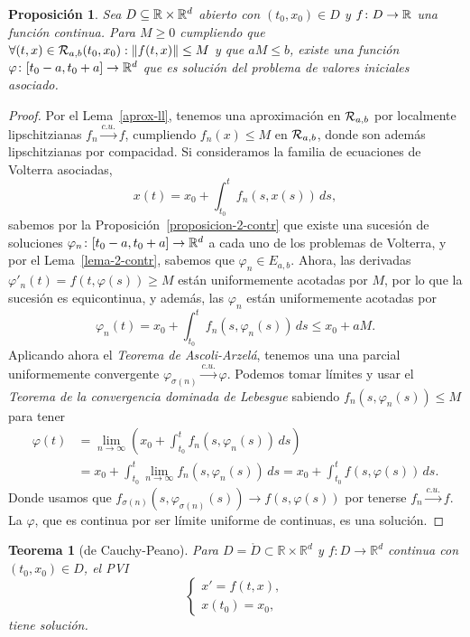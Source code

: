 \documentclass[11pt]{article}
\theoremstyle{plain}
\newtheorem{theorem}{Teorema}
\newtheorem{proposition}{Proposición}
\theoremstyle{definition}
\theoremstyle{remark}
\begin{document}
\begin{proposition}\label{propcauchypeano}
  Sea $D \subseteq \mathbb{R} \times \mathbb{R}^d$ abierto con $(t_0,x_0) \in D$ y $f \colon D \to \mathbb{R}$ una función continua.
  Para \(M \geq 0\) cumpliendo que \(\forall (t,x)\in {{\cal{R}}}_{a,b}(t_0,x_0) : \|f(t,x)\| \leq M\) y
  que $aM \leq b$, existe una función $\varphi \colon [t_0-a,t_0+a] \to \mathbb{R}^d$ que es solución
  del problema de valores iniciales asociado.
\end{proposition}
\begin{proof}
  Por el Lema~\ref{aprox-ll}, tenemos una aproximación en ${{\cal{R}}}_{a,b}$ por localmente
  lipschitzianas $f_n \overset{c.u.}\longrightarrow f$, cumpliendo $f_n(x) \leq M$ en ${{\cal{R}}}_{a,b}$, donde
  son además lipschitzianas por compacidad. Si consideramos la familia de ecuaciones
  de Volterra asociadas,
  \[
    x(t) = x_0 + \int_{t_0}^t f_n(s,x(s))\,ds,
  \]
  sabemos por la Proposición~\ref{proposicion-2-contr} que existe una sucesión
  de soluciones $\varphi_n \colon [t_0-a,t_0+a]\to\mathbb{R}^d$ a cada uno de los problemas de Volterra,
  y por el Lema~\ref{lema-2-contr}, sabemos que $\varphi_n \in E_{a,b}$.
  Ahora, las derivadas $\varphi'_n(t) = f(t,\varphi(s)) \geq M$ están uniformemente acotadas por $M$,
  por lo que la sucesión es equicontinua, y además, las $\varphi_n$ están uniformemente acotadas
  por
  \[
    \varphi_n(t) = x_0 + \int_{t_0}^t f_n(s,\varphi_n(s))\,ds \leq x_0 + aM.
  \]
  Aplicando ahora el \textit{Teorema de Ascoli-Arzelá}, tenemos una una parcial uniformemente
  convergente $\varphi_{\sigma(n)} \overset{c.u.}\longrightarrow \varphi$. Podemos tomar límites y usar el \textit{Teorema de la convergencia
  dominada de Lebesgue} sabiendo $f_n(s,\varphi_n(s)) \leq M$ para tener
  \[\begin{aligned}
    \varphi(t) &=
    \lim_{n \to \infty} \left(x_0 + \int_{t_0}^t f_n(s,\varphi_n(s))\,ds\right) \\&=
    x_0 + \int_{t_0}^t \lim_{n \to \infty} f_n(s,\varphi_n(s))\,ds =
    x_0 + \int_{t_0}^t f(s,\varphi(s))\,ds.
  \end{aligned}\]
  Donde usamos que $f_{\sigma(n)}(s,\varphi_{\sigma(n)}(s)) \to f(s,\varphi(s))$ por tenerse $f_n \overset{c.u.}\longrightarrow f$. La $\varphi$,
  que es continua por ser límite uniforme de continuas, es una solución.
\end{proof}
\begin{theorem}[de Cauchy-Peano]
  Para $D = \mathring{D} \subset \mathbb{R} \times \mathbb{R}^d$ y $f \colon D \to \mathbb{R}^{d}$ continua con $(t_0,x_0) \in D$, el PVI
 \[\left\{\begin{array}{c}
 x' = f(t,x), \\
 x(t_0) = x_0,
          \end{array}\right.\]
  tiene solución.
\end{theorem}
\end{document}
